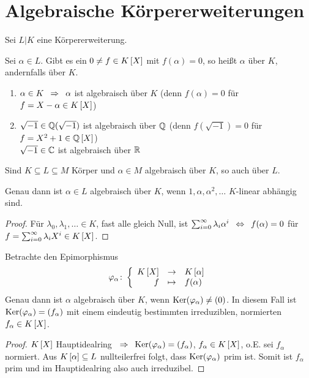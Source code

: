 \section{Algebraische Körpererweiterungen}
Sei $L | K$ eine Körpererweiterung.

\begin{definition}[!]
    Sei $\alpha \in L$. Gibt es ein $0 \neq f \in \polynom[K]$ mit $f(\alpha) = 0$, so heißt $\alpha$  über $K$, andernfalls  über $K$.
\end{definition}

\begin{beispiel}
    \begin{enumerate}[nolistsep, leftmargin=*, label=(\alph*)]
        \item $\alpha \in K \enskip \Rightarrow \enskip \alpha$ ist algebraisch über $K$ (denn $f(\alpha) = 0$ für $f = X - \alpha \in \polynom[K]$)
        \item $\sqrt{-1} \in \mathbb{Q}(\sqrt{-1})$ ist algebraisch über $\mathbb{Q}$ (denn $f(\sqrt{-1})=0$ für $f = X^2 + 1 \in \polynom[\Q]$) \\
        $\sqrt{-1} \in \mathbb{C}$ ist algebraisch über $\mathbb{R}$        
    \end{enumerate}
\end{beispiel}

\begin{bemerkung}
    Sind $K \subseteq L \subseteq M$ Körper und $\alpha \in M$ algebraisch über $K$, so auch über $L$.
\end{bemerkung}

\begin{lemma} \label{lemma: 1_2.4}
    Genau dann ist $\alpha \in L$ algebraisch über $K$, wenn $1, \alpha, \alpha^2 , \dots$ $K$-linear abhängig sind.
\end{lemma}
\begin{proof}
    Für $\lambda_0 , \lambda_1 , \dots \in K$, fast alle gleich Null, ist
    $\sum_{i=0}^\infty \lambda_i \alpha^i \enskip \Leftrightarrow \enskip f(\alpha) = 0$ für $f = \sum_{i=0}^\infty \lambda_i X^i \in \polynom[K]$.
\end{proof}

\begin{lemma}
    Betrachte den Epimorphismus
    \begin{equation*}
        \bigabb{\phi_\alpha}{\polynom[K]}{\polynom[K][\alpha]}{f}{f(\alpha)}
    \end{equation*}
    Genau dann ist $\alpha$ algebraisch über $K$, wenn $\operatorname{Ker}(\varphi_\alpha) \neq (0)$. In diesem Fall ist $\operatorname{Ker}(\varphi_\alpha) = (f_\alpha)$ mit einem eindeutig bestimmten irreduziblen, normierten $f_\alpha \in \polynom[K]$.
\end{lemma}
\begin{proof}
    $\polynom[K]$ Hauptidealring $\enskip \Rightarrow \enskip \operatorname{Ker}(\varphi_\alpha) = (f_\alpha)$, $f_\alpha \in \polynom[K]$, o.E. sei $f_\alpha$ normiert. Aus $\polynom[K][\alpha] \subseteq L$ nullteilerfrei folgt, dass $\operatorname{Ker}(\varphi_\alpha)$ prim ist. Somit ist $f_\alpha$ prim und im Hauptidealring also auch irreduzibel.
\end{proof}

